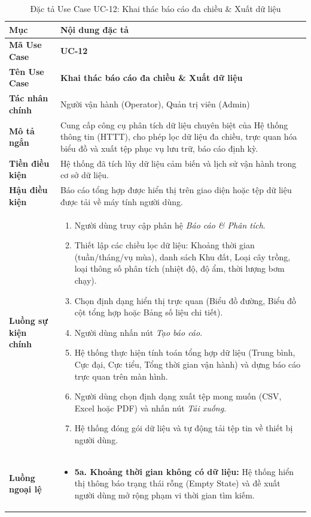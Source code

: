 \begin{table}[H]
\centering
\small
\begin{tabularx}{\textwidth}{|p{3.2cm}|X|}
\hline
\textbf{Mục} & \textbf{Nội dung đặc tả} \\ \hline
\textbf{Mã Use Case} & \textbf{UC-12} \\ \hline
\textbf{Tên Use Case} & \textbf{Khai thác báo cáo đa chiều \& Xuất dữ liệu} \\ \hline
\textbf{Tác nhân chính} & Người vận hành (Operator), Quản trị viên (Admin) \\ \hline
\textbf{Mô tả ngắn} & Cung cấp công cụ phân tích dữ liệu chuyên biệt của Hệ thống thông tin (HTTT), cho phép lọc dữ liệu đa chiều, trực quan hóa biểu đồ và xuất tệp phục vụ lưu trữ, báo cáo định kỳ. \\ \hline
\textbf{Tiền điều kiện} & Hệ thống đã tích lũy dữ liệu cảm biến và lịch sử vận hành trong cơ sở dữ liệu. \\ \hline
\textbf{Hậu điều kiện} & Báo cáo tổng hợp được hiển thị trên giao diện hoặc tệp dữ liệu được tải về máy tính người dùng. \\ \hline
\textbf{Luồng sự kiện chính} & 
\begin{enumerate}[leftmargin=*, nosep]
    \item Người dùng truy cập phân hệ \textit{Báo cáo \& Phân tích}.
    \item Thiết lập các chiều lọc dữ liệu: Khoảng thời gian (tuần/tháng/vụ mùa), danh sách Khu đất, Loại cây trồng, loại thông số phân tích (nhiệt độ, độ ẩm, thời lượng bơm chạy).
    \item Chọn định dạng hiển thị trực quan (Biểu đồ đường, Biểu đồ cột tổng hợp hoặc Bảng số liệu chi tiết).
    \item Người dùng nhấn nút \textit{Tạo báo cáo}.
    \item Hệ thống thực hiện tính toán tổng hợp dữ liệu (Trung bình, Cực đại, Cực tiểu, Tổng thời gian vận hành) và dựng báo cáo trực quan trên màn hình.
    \item Người dùng chọn định dạng xuất tệp mong muốn (CSV, Excel hoặc PDF) và nhấn nút \textit{Tải xuống}.
    \item Hệ thống đóng gói dữ liệu và tự động tải tệp tin về thiết bị người dùng.
\end{enumerate} \\ \hline
\textbf{Luồng ngoại lệ} & 
\begin{itemize}[leftmargin=*, nosep]
    \item \textbf{5a. Khoảng thời gian không có dữ liệu:} Hệ thống hiển thị thông báo trạng thái rỗng (Empty State) và đề xuất người dùng mở rộng phạm vi thời gian tìm kiếm.
\end{itemize} \\ \hline
\end{tabularx}
\caption{Đặc tả Use Case UC-12: Khai thác báo cáo đa chiều \& Xuất dữ liệu}
\label{tab:uc_12}
\end{table}